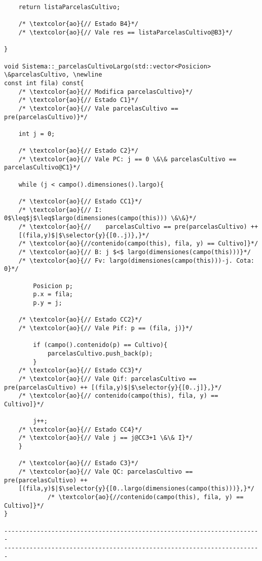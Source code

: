 \begin{lstlisting}
    return listaParcelasCultivo;
    
    /* \textcolor{ao}{// Estado B4}*/	    
    /* \textcolor{ao}{// Vale res == listaParcelasCultivo@B3}*/    
    
}

void Sistema::_parcelasCultivoLargo(std::vector<Posicion> \&parcelasCultivo, \newline  
const int fila) const{
	/* \textcolor{ao}{// Modifica parcelasCultivo}*/	        
    /* \textcolor{ao}{// Estado C1}*/	    
    /* \textcolor{ao}{// Vale parcelasCultivo == pre(parcelasCultivo)}*/      
    
    int j = 0;
	
	/* \textcolor{ao}{// Estado C2}*/	    
    /* \textcolor{ao}{// Vale PC: j == 0 \&\& parcelasCultivo == parcelasCultivo@C1}*/      
    
    while (j < campo().dimensiones().largo){

	/* \textcolor{ao}{// Estado CC1}*/	    
    /* \textcolor{ao}{// I: 0$\leq$j$\leq$largo(dimensiones(campo(this))) \&\&}*/        
    /* \textcolor{ao}{//    parcelasCultivo == pre(parcelasCultivo) ++ 
    [(fila,y)$|$\selector{y}{[0..j)},}*/
    /* \textcolor{ao}{//contenido(campo(this), fila, y) == Cultivo]}*/ 
    /* \textcolor{ao}{// B: j $<$ largo(dimensiones(campo(this)))}*/   
	/* \textcolor{ao}{// Fv: largo(dimensiones(campo(this)))-j. Cota: 0}*/
	     
        Posicion p;
        p.x = fila;
        p.y = j;

    /* \textcolor{ao}{// Estado CC2}*/   
	/* \textcolor{ao}{// Vale Pif: p == (fila, j)}*/
        
        if (campo().contenido(p) == Cultivo){
            parcelasCultivo.push_back(p);
        }
	/* \textcolor{ao}{// Estado CC3}*/
	/* \textcolor{ao}{// Vale Qif: parcelasCultivo == pre(parcelasCultivo) ++ [(fila,y)$|$\selector{y}{[0..j]},}*/
	/* \textcolor{ao}{// contenido(campo(this), fila, y) == Cultivo]}*/

        j++;
    /* \textcolor{ao}{// Estado CC4}*/   
	/* \textcolor{ao}{// Vale j == j@CC3+1 \&\& I}*/
    }
	
	/* \textcolor{ao}{// Estado C3}*/	    
    /* \textcolor{ao}{// Vale QC: parcelasCultivo == pre(parcelasCultivo) ++ 
    [(fila,y)$|$\selector{y}{[0..largo(dimensiones(campo(this)))},}*/
    		/* \textcolor{ao}{//contenido(campo(this), fila, y) == Cultivo]}*/      
}

-----------------------------------------------------------------------
-----------------------------------------------------------------------


\end{lstlisting}
